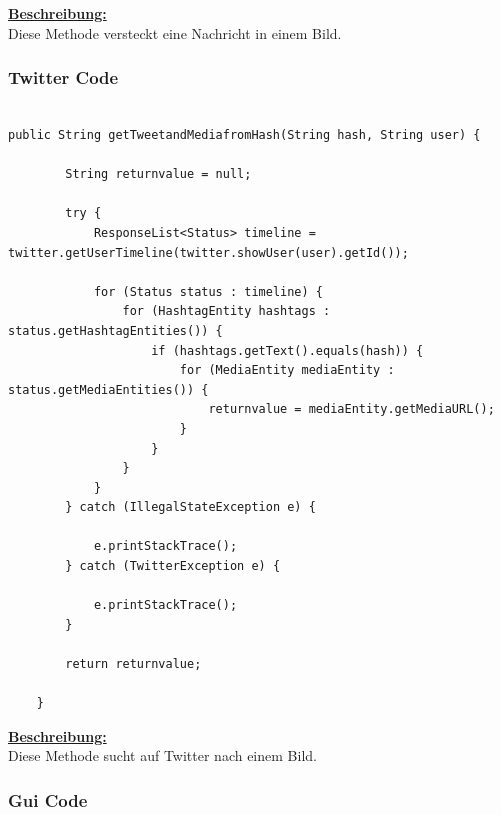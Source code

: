 \documentclass[11pt]{article}
\begin{document}
\underline{\textbf{Beschreibung:}}\\
Diese Methode versteckt eine Nachricht in einem Bild.\\

\newpage
\subsubsection{Twitter Code}
\begin{lstlisting}[frame=single]  % Start your code-block

public String getTweetandMediafromHash(String hash, String user) {

		String returnvalue = null;

		try {
			ResponseList<Status> timeline = twitter.getUserTimeline(twitter.showUser(user).getId());

			for (Status status : timeline) {
				for (HashtagEntity hashtags : status.getHashtagEntities()) {
					if (hashtags.getText().equals(hash)) {
						for (MediaEntity mediaEntity : status.getMediaEntities()) {
							returnvalue = mediaEntity.getMediaURL();
						}
					}
				}
			}
		} catch (IllegalStateException e) {

			e.printStackTrace();
		} catch (TwitterException e) {

			e.printStackTrace();
		}

		return returnvalue;

	}
\end{lstlisting}

\underline{\textbf{Beschreibung:}}\\
Diese Methode sucht auf Twitter nach einem Bild.\\

\newpage
\subsubsection{Gui Code}
\end{document}
